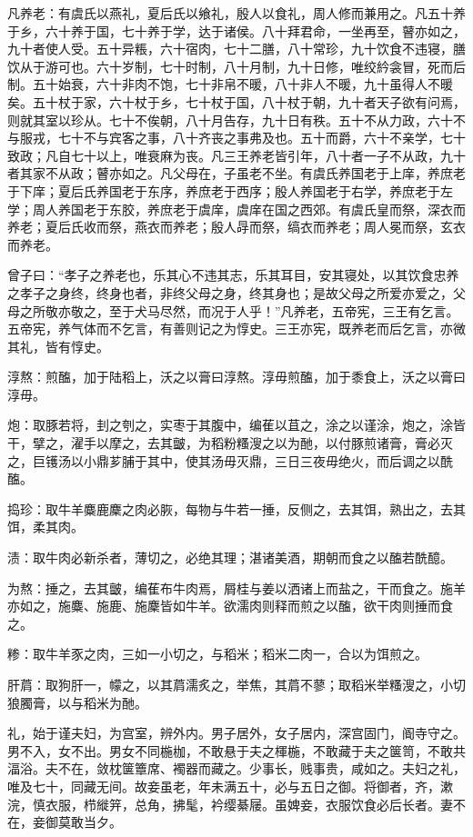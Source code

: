 \documentclass[]{article}
\begin{document}
凡养老：有虞氏以燕礼，夏后氏以飨礼，殷人以食礼，周人修而兼用之。凡五十养于乡，六十养于国，七十养于学，达于诸侯。八十拜君命，一坐再至，瞽亦如之，九十者使人受。五十异粻，六十宿肉，七十二膳，八十常珍，九十饮食不违寝，膳饮从于游可也。六十岁制，七十时制，八十月制，九十日修，唯绞紟衾冒，死而后制。五十始衰，六十非肉不饱，七十非帛不暖，八十非人不暖，九十虽得人不暖矣。五十杖于家，六十杖于乡，七十杖于国，八十杖于朝，九十者天子欲有问焉，则就其室以珍从。七十不俟朝，八十月告存，九十日有秩。五十不从力政，六十不与服戎，七十不与宾客之事，八十齐丧之事弗及也。五十而爵，六十不亲学，七十致政；凡自七十以上，唯衰麻为丧。凡三王养老皆引年，八十者一子不从政，九十者其家不从政；瞽亦如之。凡父母在，子虽老不坐。有虞氏养国老于上庠，养庶老于下庠；夏后氏养国老于东序，养庶老于西序；殷人养国老于右学，养庶老于左学；周人养国老于东胶，养庶老于虞庠，虞庠在国之西郊。有虞氏皇而祭，深衣而养老；夏后氏收而祭，燕衣而养老；殷人冔而祭，缟衣而养老；周人冕而祭，玄衣而养老。

曾子曰：``孝子之养老也，乐其心不违其志，乐其耳目，安其寝处，以其饮食忠养之孝子之身终，终身也者，非终父母之身，终其身也；是故父母之所爱亦爱之，父母之所敬亦敬之，至于犬马尽然，而况于人乎！''凡养老，五帝宪，三王有乞言。五帝宪，养气体而不乞言，有善则记之为惇史。三王亦宪，既养老而后乞言，亦微其礼，皆有惇史。

淳熬：煎醢，加于陆稻上，沃之以膏曰淳熬。淳毋煎醢，加于黍食上，沃之以膏曰淳毋。

炮：取豚若将，刲之刳之，实枣于其腹中，编萑以苴之，涂之以谨涂，炮之，涂皆干，擘之，濯手以摩之，去其皽，为稻粉糔溲之以为酏，以付豚煎诸膏，膏必灭之，巨镬汤以小鼎芗脯于其中，使其汤毋灭鼎，三日三夜毋绝火，而后调之以酰醢。

捣珍：取牛羊麋鹿麇之肉必脄，每物与牛若一捶，反侧之，去其饵，熟出之，去其饵，柔其肉。

渍：取牛肉必新杀者，薄切之，必绝其理；湛诸美酒，期朝而食之以醢若酰醷。

为熬：捶之，去其皽，编萑布牛肉焉，屑桂与姜以洒诸上而盐之，干而食之。施羊亦如之，施麋、施鹿、施麇皆如牛羊。欲濡肉则释而煎之以醢，欲干肉则捶而食之。

糁：取牛羊豕之肉，三如一小切之，与稻米；稻米二肉一，合以为饵煎之。

肝菺：取狗肝一，幪之，以其菺濡炙之，举焦，其菺不蓼；取稻米举糔溲之，小切狼臅膏，以与稻米为酏。

礼，始于谨夫妇，为宫室，辨外内。男子居外，女子居内，深宫固门，阍寺守之。男不入，女不出。男女不同椸枷，不敢悬于夫之楎椸，不敢藏于夫之箧笥，不敢共湢浴。夫不在，敛枕箧簟席、襡器而藏之。少事长，贱事贵，咸如之。夫妇之礼，唯及七十，同藏无间。故妾虽老，年未满五十，必与五日之御。将御者，齐，漱浣，慎衣服，栉縰笄，总角，拂髦，衿缨綦屦。虽婢妾，衣服饮食必后长者。妻不在，妾御莫敢当夕。
\end{document}

